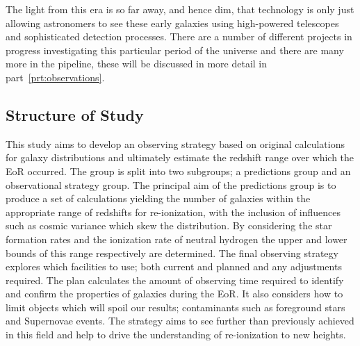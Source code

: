 	The light from this era is so far away, and hence dim, that technology is only just allowing astronomers to see these early galaxies using high-powered telescopes and sophisticated detection processes. There are a number of different projects in progress investigating this particular period of the universe and there are many more in the pipeline, these will be discussed in more detail in part~\ref{prt:observations}.

    \subsection{Structure of Study} %
    \label{Structure_of_Study}
		This study aims to develop an observing strategy based on original calculations for galaxy distributions and ultimately estimate the redshift range over which the EoR occurred. The group is split into two subgroups; a predictions group and an observational strategy group. The principal aim of the predictions group is to produce a set of calculations yielding the number of galaxies within the appropriate range of redshifts for re-ionization, with the inclusion of influences such as cosmic variance which skew the distribution. By considering the star formation rates and the ionization rate of neutral hydrogen the upper and lower bounds of this range respectively are determined. The final observing strategy explores which facilities to use; both current and planned and any adjustments required. The plan calculates the amount of observing time required to identify and confirm the properties of galaxies during the EoR. It also considers how to limit objects which will spoil our results; contaminants such as foreground stars and Supernovae events. The strategy aims to see further than previously achieved in this field and help to drive the understanding of re-ionization to new heights.
